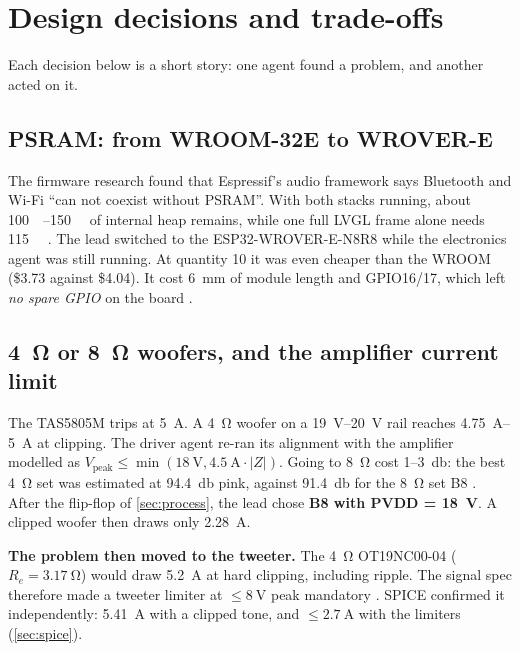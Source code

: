 \section{Design decisions and trade-offs}\label{sec:decisions}

Each decision below is a short story: one agent found a problem, and another acted on it.

\subsection{PSRAM: from WROOM-32E to WROVER-E}\label{sec:psram}

The firmware research found that Espressif's audio framework says Bluetooth and Wi-Fi ``can not coexist without PSRAM''. With both stacks running, about \qtyrange{100}{150}{\kilo\byte} of internal heap remains, while one full LVGL frame alone needs \qty{115}{\kilo\byte} . The lead switched to the ESP32-WROVER-E-N8R8 while the electronics agent was still running. At quantity 10 it was even cheaper than the WROOM (\$3.73 against \$4.04). It cost \qty{6}{\milli\metre} of module length and GPIO16/17, which left \emph{no spare GPIO} on the board .

\subsection{\texorpdfstring{\qty{4}{\ohm}}{4 Ω} or \texorpdfstring{\qty{8}{\ohm}}{8 Ω} woofers, and the amplifier current limit}\label{sec:impedance}

The TAS5805M trips at \qty{5}{\ampere}. A \qty{4}{\ohm} woofer on a \qtyrange{19}{20}{\volt} rail reaches \qtyrange{4.75}{5}{\ampere} at clipping. The driver agent re-ran its alignment with the amplifier modelled as $V_\text{peak}\le\min(\qty{18}{\volt}, \qty{4.5}{\ampere}\cdot|Z|)$. Going to \qty{8}{\ohm} cost 1--\qty{3}{\decibel}: the best \qty{4}{\ohm} set was estimated at \qty{94.4}{\decibel} pink, against \qty{91.4}{\decibel} for the \qty{8}{\ohm} set B8 . After the flip-flop of \cref{sec:process}, the lead chose \textbf{B8 with PVDD = \qty{18}{\volt}}. A clipped woofer then draws only \qty{2.28}{\ampere}.

\textbf{The problem then moved to the tweeter.} The \qty{4}{\ohm} OT19NC00-04 ($R_e=\qty{3.17}{\ohm}$) would draw \qty{5.2}{\ampere} at hard clipping, including ripple. The signal spec therefore made a tweeter limiter at $\le\qty{8}{\volt}$ peak mandatory . SPICE confirmed it independently: \qty{5.41}{\ampere} with a clipped tone, and $\le\qty{2.7}{\ampere}$ with the limiters (\cref{sec:spice}).

